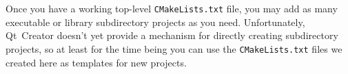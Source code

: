 \documentclass[letterpaper]{article}
\begin{document}
  Once you have a working top-level \verb|CMakeLists.txt| file, you may add as many
  executable or library subdirectory projects as you need. Unfortunately, Qt~Creator
  doesn't yet provide a mechanism for directly creating subdirectory projects, so
  at least for the time being you can use the \verb|CMakeLists.txt| files we created
  here as templates for new projects.
\end{document}
